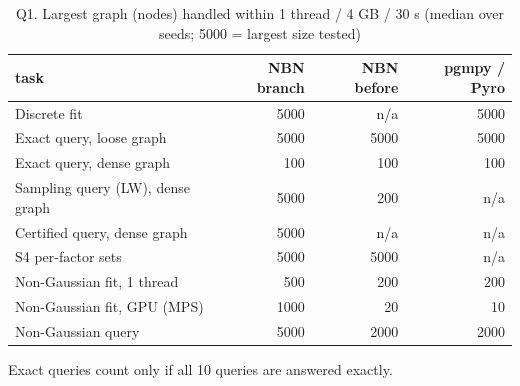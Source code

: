 \begin{table}[H]\centering\small
\caption{Q1. Largest graph (nodes) handled within 1 thread / 4 GB / 30 s (median over seeds; 5000 = largest size tested)}\label{tab:q1}

\begin{tabular}{lrrr}\toprule
task & NBN branch & NBN before & pgmpy / Pyro \\ \midrule
Discrete fit & 5000 & n/a & 5000 \\
Exact query, loose graph & 5000 & 5000 & 5000 \\
Exact query, dense graph & 100 & 100 & 100 \\
Sampling query (LW), dense graph & 5000 & 200 & n/a \\
Certified query, dense graph & 5000 & n/a & n/a \\
S4 per-factor sets & 5000 & 5000 & n/a \\
Non-Gaussian fit, 1 thread & 500 & 200 & 200 \\
Non-Gaussian fit, GPU (MPS) & 1000 & 20 & 10 \\
Non-Gaussian query & 5000 & 2000 & 2000 \\
\bottomrule\end{tabular}
\par\smallskip\footnotesize Exact queries count only if all 10 queries are answered exactly.
\end{table}
